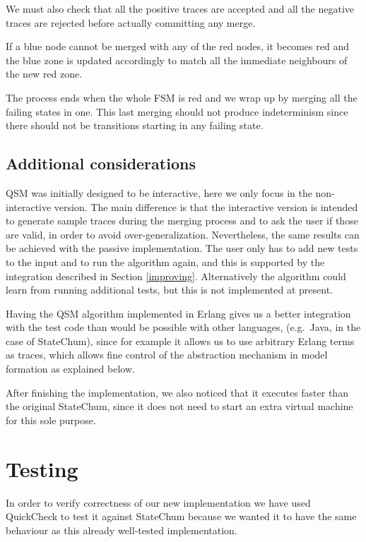 \documentclass[]{sigplanconf}
\begin{document}
We must also check that all the positive traces are accepted and
all the negative traces are rejected before actually committing
any merge.

If a blue node cannot be merged with any of the red nodes,
it becomes red and the blue zone is updated accordingly to
match all the immediate neighbours of the new red zone.

The process ends when the whole FSM is red and we wrap up by
merging all the failing states in one. This last merging should
not produce indeterminism since there should not be transitions
starting in any failing state.

\subsection{Additional considerations}

QSM was initially designed to be interactive, here we only
focus in the non-interactive version. The main difference is that the interactive
version is intended to generate sample traces during the merging process and to ask
the user if those are valid, in order to avoid over-generalization.
Nevertheless, the same results can be achieved with the passive
implementation. The user only has to add new tests to the input
and to run the algorithm again, and this is supported by the integration described in Section \ref{improving}. Alternatively
the algorithm could learn from running additional tests, but this is not implemented at present. 

Having the QSM algorithm implemented in Erlang
gives us a better integration with the test code than would be possible with other languages, (e.g.\ Java, in the case of StateChum), since for
example it allows us to use arbitrary Erlang terms as traces, which allows fine control of the abstraction mechanism in model formation as explained below.

After finishing the implementation, we also noticed that it executes
faster than the original StateChum, since it does not need to start an extra virtual machine for this sole purpose.

\section{Testing}
\label{testing}

In order to verify correctness of our new implementation
we have used QuickCheck to test it against StateChum \cite{statechum}
because we wanted it to have the same behaviour as this already well-tested
implementation.
\end{document}
